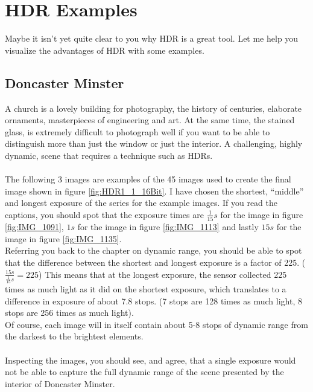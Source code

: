 \section{HDR Examples}

Maybe it isn't yet quite clear to you why \gls{HDR} is a great tool. Let me help you visualize the advantages of \gls{HDR} with some examples.

\subsection{Doncaster Minster}

A church is a lovely building for photography, the history of centuries, elaborate ornaments, masterpieces of engineering and art. At the same time, the stained glass, is extremely difficult to photograph well if you want to be able to distinguish more than just the window or just the interior. A challenging, highly dynamic, scene that requires a technique such as \glspl{HDR}.
\\
\\
The following 3 images are examples of the 45 images used to create the final image shown in figure \ref{fig:HDR1_1_16Bit}. I have chosen the shortest, ``middle'' and longest \gls{exposure} of the series for the example images. If you read the captions, you should spot that the exposure times are $\frac{1}{15}s$ for the image in figure \ref{fig:IMG_1091}, $1s$ for the image in figure \ref{fig:IMG_1113} and lastly $15s$ for the image in figure \ref{fig:IMG_1135}.
\\
Referring you back to the chapter on dynamic range, you should be able to spot that the difference between the shortest and longest \gls{exposure} is a factor of 225. ($\frac{15s}{\frac{1}{15}s} = 225$) This means that at the longest \gls{exposure}, the \gls{sensor} collected 225 times as much light as it did on the shortest \gls{exposure}, which translates to a difference in \gls{exposure} of about 7.8 \glspl{stop}. (7 \glspl{stop} are 128 times as much light, 8 \glspl{stop} are 256 times as much light).
\\
Of course, each image will in itself contain about 5-8 \glspl{stop} of dynamic range from the darkest to the brightest elements.
\\
\\
Inspecting the images, you should see, and agree, that a single \gls{exposure} would not be able to capture the full dynamic range of the scene presented by the interior of Doncaster Minster.

